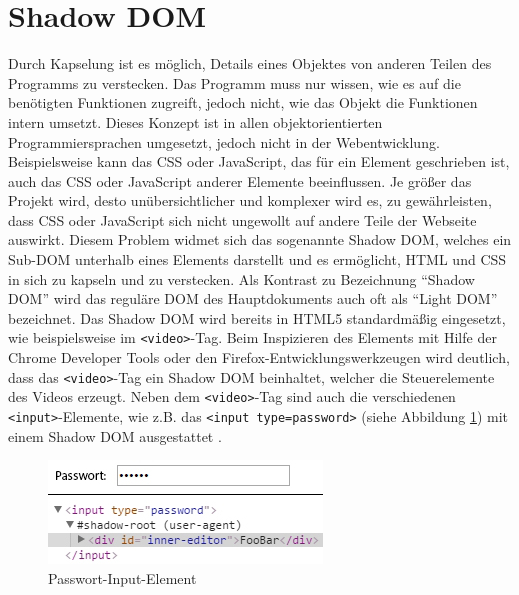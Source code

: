 \section{Shadow DOM}\label{shadow-dom}

Durch Kapselung ist es möglich, Details eines Objektes von anderen Teilen des Programms zu verstecken. Das Programm muss nur wissen, wie es auf die benötigten Funktionen zugreift, jedoch nicht, wie das Objekt die Funktionen intern umsetzt. Dieses Konzept ist in allen objektorientierten Programmiersprachen umgesetzt, jedoch nicht in der Webentwicklung. Beispielsweise kann das \ac{CSS} oder JavaScript, das für ein Element geschrieben ist, auch das \ac{CSS} oder JavaScript anderer Elemente beeinflussen. Je größer das Projekt wird, desto unübersichtlicher und komplexer wird es, zu gewährleisten, dass \ac{CSS} oder JavaScript sich nicht ungewollt auf andere Teile der Webseite auswirkt. Diesem Problem widmet sich das sogenannte Shadow \ac{DOM}, welches ein Sub-\ac{DOM} unterhalb eines Elements darstellt und es ermöglicht, \ac{HTML} und \ac{CSS} in sich zu kapseln und zu verstecken. Als Kontrast zu Bezeichnung ``Shadow \ac{DOM}'' wird das reguläre \ac{DOM} des Hauptdokuments auch oft als ``Light \ac{DOM}'' bezeichnet. Das Shadow \ac{DOM} wird bereits in \ac{HTML}5 standardmäßig eingesetzt, wie beispielsweise im \texttt{\textless{}video\textgreater{}}-Tag. Beim Inspizieren des Elements mit Hilfe der Chrome Developer Tools oder den Firefox-Entwicklungswerkzeugen wird deutlich, dass das \texttt{\textless{}video\textgreater{}}-Tag ein Shadow \ac{DOM} beinhaltet, welcher die Steuerelemente des Videos erzeugt. Neben dem \texttt{\textless{}video\textgreater{}}-Tag sind auch die verschiedenen \texttt{\textless{}input\textgreater{}}-Elemente, wie z.B. das \texttt{\textless{}input\ type=\dq password\dq \textgreater{}} (siehe Abbildung \ref{fig:itpelem}) mit einem Shadow \ac{DOM} ausgestattet \cite[S. 109-126]{citeulike:13844975}.

\begin{figure}[htbp]
 \centering
 \includegraphics{kapitel2/bilder/3-shadow-dom-input-type-password}
 \caption{Passwort-Input-Element}
 \label{fig:itpelem}
\end{figure}


